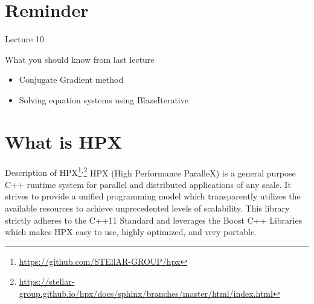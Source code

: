 \documentclass[12pt,t]{beamer}
\title{\coursename}
\subtitle{Lecture 11: Introduction to HPX}
\date {
 \tiny \url{\courseurl}
\vspace{2cm}
\doclicenseThis  
  
}
\begin{document}
 {
    \frame {
        \titlepage
    }
}

\frame{

\tableofcontents

}


\section{Reminder}
\begin{frame}{Lecture 10}
\begin{block}{What you should know from last lecture}
\begin{itemize}
\item Conjugate Gradient method
\item Solving equation systems using BlazeIterative
\end{itemize}
\end{block}
\end{frame}


\section{What is HPX}

\begin{frame}{Description of HPX\footnote{\tiny\url{https://github.com/STEllAR-GROUP/hpx}}$^,$\footnote{\tiny\url{https://stellar-group.github.io/hpx/docs/sphinx/branches/master/html/index.html}}}
HPX (High Performance ParalleX) is a general purpose C++ runtime system for parallel and distributed applications of any scale. It strives to provide a unified programming model which transparently utilizes the available resources to achieve unprecedented levels of scalability.  This library strictly adheres to the C++11 Standard and leverages the Boost C++ Libraries which makes HPX easy to use, highly optimized, and very portable. 
\end{frame}
\end{document}
